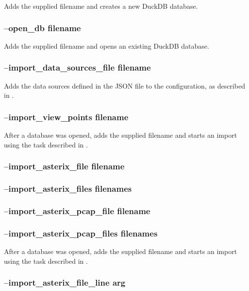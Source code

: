 Adds the supplied filename and creates a new DuckDB database.
 
\subsubsection{--open\_db filename}

Adds the supplied filename and opens an existing DuckDB database.

\subsubsection{--import\_data\_sources\_file filename}

Adds the data sources defined in the JSON file to the configuration, as described in .

\subsubsection{--import\_view\_points filename}

After a database was opened, adds the supplied filename and starts an import using the task described in .
 
\subsubsection{--import\_asterix\_file filename}
\subsubsection{--import\_asterix\_files filenames}
\subsubsection{--import\_asterix\_pcap\_file filename}
\subsubsection{--import\_asterix\_pcap\_files filenames}

After a database was opened, adds the supplied filename and starts an import using the task described in .

\subsubsection{--import\_asterix\_file\_line arg}

